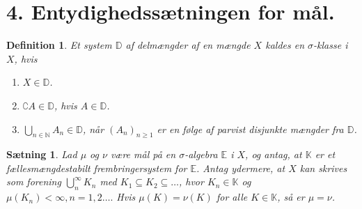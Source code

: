 \documentclass[12pt]{report}
\newtheorem{theorem}[lemma]{Sætning}
\newtheorem{definition}[lemma]{Definition}
\theoremstyle{break}
\theoremstyle{break}
\newcommand{\EE}{\mathbb{E}}
\newcommand{\K}{\mathbb{K}}
\newcommand{\D}{\mathbb{D}}
\newcommand{\1}{\mathds{1}}
\begin{document}
\newpage
\section*{4. Entydighedssætningen for mål.}
\begin{definition}
Et system $\D$ af delmængder af en mængde $X$ kaldes en $\sigma$-klasse i $X$, hvis
\begin{enumerate}
\item $X\in\D$.
\item $\complement A\in\D$, hvis $A\in\D$.
\item $\bigcup_{n\in\mathbb{N}}A_n\in\D$, når $(A_n)_{n\geq 1}$ er en følge af parvist disjunkte mængder fra $\D$.
\end{enumerate}
\end{definition}
\begin{theorem}
Lad $\mu$ og $\nu$ være mål på en $\sigma$-algebra $\EE$ i $X$, og antag, at $\K$ er et fællesmængdestabilt frembringersystem for $\EE$.  Antag ydermere, at $X$ kan skrives som forening $\bigcup^\infty_nK_n$ med $K_1\subseteq K_2\subseteq\ldots$, hvor $K_n\in\K$ og $\mu(K_n)<\infty, n=1,2\ldots.$ Hvis $\mu(K)=\nu(K)$ for alle $K\in\K$, så er $\mu=\nu$.
\end{theorem}
\end{document}
